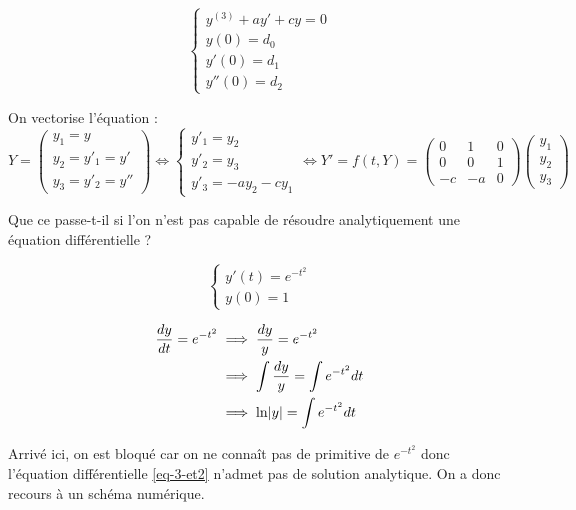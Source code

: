 	\bigskip

	\begin{ex}
		\begin{equation}
			\label{eq-3-ex3ordre}
			\begin{cases}
				y^{(3)} + ay' + cy = 0	\\
				y(0) = d_0		\\
				y'(0) = d_1		\\
				y''(0) = d_2
			\end{cases}
		\end{equation}

		On vectorise l'équation :
		$$
			Y = \begin{pmatrix}
				y_1 = y			\\
				y_2 = y'_1 = y'	\\
				y_3 = y'_2 = y''
			\end{pmatrix}
			\iff
			\begin{cases}
				y'_1 = y_2	\\
				y'_2 = y_3	\\
				y'_3 = -ay_2 - cy_1
			\end{cases}
			\iff
			Y' = f(t,Y) = \begin{pmatrix}
				0	&	1	&	0	\\	
				0	&	0	&	1	\\	
				-c	&	-a	&	0	
			\end{pmatrix}
			\begin{pmatrix}
				y_1	\\	
				y_2	\\	
				y_3		
			\end{pmatrix}
			$$
	\end{ex}

	Que ce passe-t-il si l'on n'est pas capable de résoudre analytiquement une équation différentielle ?

	\begin{ex}
		\begin{equation}
			\label{eq-3-et2}
			\begin{cases}
				y'(t) = e^{-t^2}	\\
				y(0) = 1
			\end{cases}
		\end{equation}
		
		\begin{align*}
			\frac{dy}{dt} = e^{-t^2} 	&\implies \frac{dy}{y} = e^{-t^2}				\\	
										&\implies \int \frac{dy}{y} = \int e^{-t^2} dt	\\
										&\implies \ln\lvert y \rvert = \int e^{-t^2} dt
		\end{align*}

		Arrivé ici, on est bloqué car on ne connaît pas de primitive de $e^{-t^2}$ donc l'équation différentielle \eqref{eq-3-et2} n'admet pas de solution analytique. On a donc recours à un schéma numérique.
	\end{ex}


